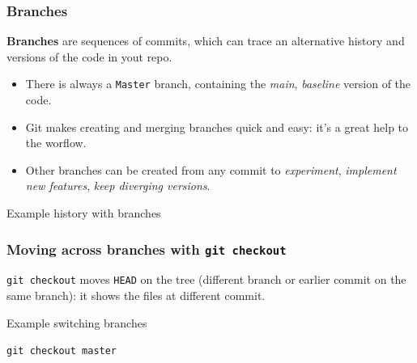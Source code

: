 \documentclass[10pt,svgnames]{beamer}
\begin{document}
\begin{frame}
\frametitle{Branches}

\textbf{Branches} are sequences of commits, which can trace an alternative history and versions of the code in yout repo.\\
\begin{itemize}
  \item There is always a \lstinline{Master} branch, containing the \emph{main}, \emph{baseline} version of the code.
  \item Git makes creating and merging branches quick and easy: it's a great help to the worflow.
  \item Other branches can be created from any commit to \emph{experiment}, \emph{implement new features}, \emph{keep diverging versions}.
\end{itemize}
\pause

\begin{block}{Example history with branches}

\end{block}

\end{frame}


\begin{frame}
\frametitle{Moving across branches with \lstinline{git checkout}}

\lstinline{git checkout} moves \lstinline{HEAD} on the tree (different branch or earlier commit on the same branch): it shows the files at  different commit.\\
\medskip
\pause

\begin{block}{Example switching branches}

\pause
\lstinline{git checkout master}
\pause


\end{block}
\end{frame}
\end{document}

